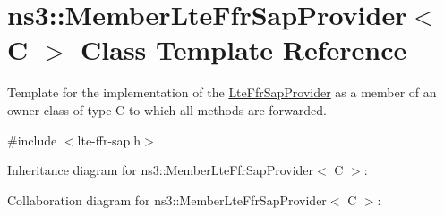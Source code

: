 \hypertarget{classns3_1_1MemberLteFfrSapProvider}{}\section{ns3\+:\+:Member\+Lte\+Ffr\+Sap\+Provider$<$ C $>$ Class Template Reference}
\label{classns3_1_1MemberLteFfrSapProvider}


Template for the implementation of the \hyperlink{classns3_1_1LteFfrSapProvider}{Lte\+Ffr\+Sap\+Provider} as a member of an owner class of type C to which all methods are forwarded.  




{\ttfamily \#include $<$lte-\/ffr-\/sap.\+h$>$}



Inheritance diagram for ns3\+:\+:Member\+Lte\+Ffr\+Sap\+Provider$<$ C $>$\+:


Collaboration diagram for ns3\+:\+:Member\+Lte\+Ffr\+Sap\+Provider$<$ C $>$\+:
